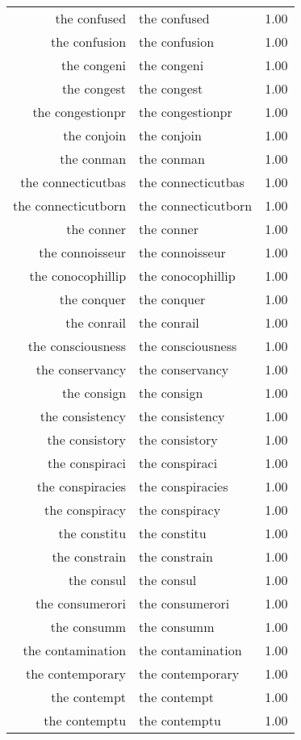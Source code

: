\begin{table}[ht]
\begin{tabular}{rlr}
  the confused & the confused & 1.00 \\ 
  the confusion & the confusion & 1.00 \\ 
  the congeni & the congeni & 1.00 \\ 
  the congest & the congest & 1.00 \\ 
  the congestionpr & the congestionpr & 1.00 \\ 
  the conjoin & the conjoin & 1.00 \\ 
  the conman & the conman & 1.00 \\ 
  the connecticutbas & the connecticutbas & 1.00 \\ 
  the connecticutborn & the connecticutborn & 1.00 \\ 
  the conner & the conner & 1.00 \\ 
  the connoisseur & the connoisseur & 1.00 \\ 
  the conocophillip & the conocophillip & 1.00 \\ 
  the conquer & the conquer & 1.00 \\ 
  the conrail & the conrail & 1.00 \\ 
  the consciousness & the consciousness & 1.00 \\ 
  the conservancy & the conservancy & 1.00 \\ 
  the consign & the consign & 1.00 \\ 
  the consistency & the consistency & 1.00 \\ 
  the consistory & the consistory & 1.00 \\ 
  the conspiraci & the conspiraci & 1.00 \\ 
  the conspiracies & the conspiracies & 1.00 \\ 
  the conspiracy & the conspiracy & 1.00 \\ 
  the constitu & the constitu & 1.00 \\ 
  the constrain & the constrain & 1.00 \\ 
  the consul & the consul & 1.00 \\ 
  the consumerori & the consumerori & 1.00 \\ 
  the consumm & the consumm & 1.00 \\ 
  the contamination & the contamination & 1.00 \\ 
  the contemporary & the contemporary & 1.00 \\ 
  the contempt & the contempt & 1.00 \\ 
  the contemptu & the contemptu & 1.00 \\ 

\end{tabular}
\end{table}
